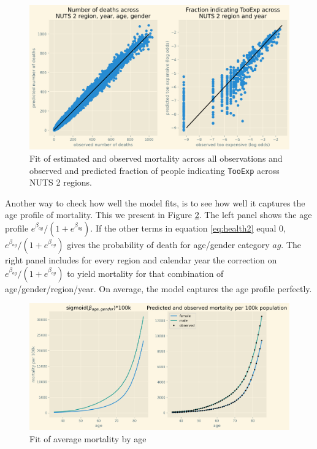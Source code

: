 \documentclass[a4paper,12pt]{article}
\begin{document}
\begin{figure}[htbp]
\centering
\includegraphics[width=.9\linewidth]{./figures/fit_baseline_model.png}
\caption{\label{fig:ModelFit}Fit of estimated and observed mortality across all observations and observed and predicted fraction of people indicating \texttt{TooExp} across NUTS 2 regions.}
\end{figure}

Another way to check how well the model fits, is to see how well it captures the age profile of mortality. This we present in Figure \ref{fig:Fit_mortality_by_age}. The left panel shows the age profile \(e^{\beta_{ag}}/(1+e^{\beta_{ag}})\). If the other terms in equation \eqref{eq:health2} equal 0, \(e^{\beta_{ag}}/(1+e^{\beta_{ag}})\) gives the probability of death for age/gender category \(ag\). The right panel includes for every region and calendar year the correction on \(e^{\beta_{ag}}/(1+e^{\beta_{ag}})\) to yield mortality for that combination of age/gender/region/year. On average, the model captures the age profile perfectly.


\begin{figure}[htbp]
\centering
\includegraphics[width=.9\linewidth]{./figures/age_profile_baseline.png}
\caption{\label{fig:Fit_mortality_by_age}Fit of average mortality by age}
\end{figure}
\end{document}
